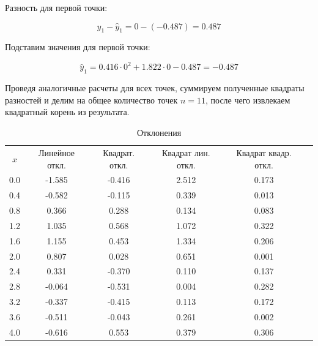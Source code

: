 \documentclass{article}
\begin{document}
            Разность для первой точки:

            \[
            y_1 - \hat{y}_1 = 0 - (-0.487) = 0.487
            \]

            Подставим значения для первой точки:

            \[
            \hat{y}_1 = 0.416 \cdot 0^2 + 1.822 \cdot 0 - 0.487 = -0.487
            \]

            Проведя аналогичные расчеты для всех точек, суммируем полученные квадраты разностей и делим на общее количество точек \(n = 11\), после чего извлекаем квадратный корень из результата.
            \begin{table}[htbp]
                  \centering
                  \label{tab:my-table}
                  \begin{tabular}{@{}cccccc@{}}
                        \(x\) & Линейное откл. & Квадрат. откл. & Квадрат лин. откл. & Квадрат квадр. откл. \\ 
                        0.0   & -1.585         & -0.416          & 2.512               & 0.173                 \\
                        0.4   & -0.582         & -0.115          & 0.339               & 0.013                 \\
                        0.8   & 0.366          & 0.288           & 0.134               & 0.083                 \\
                        1.2   & 1.035          & 0.568           & 1.072               & 0.322                 \\
                        1.6   & 1.155          & 0.453           & 1.334               & 0.206                 \\
                        2.0   & 0.807          & 0.028           & 0.651               & 0.001                 \\
                        2.4   & 0.331          & -0.370          & 0.110               & 0.137                 \\
                        2.8   & -0.064         & -0.531          & 0.004               & 0.282                 \\
                        3.2   & -0.337         & -0.415          & 0.113               & 0.172                 \\
                        3.6   & -0.511         & -0.043          & 0.261               & 0.002                 \\
                        4.0   & -0.616         & 0.553           & 0.379               & 0.306                 \\
                  \end{tabular}
                  \caption{Отклонения}
              \end{table}
\end{document}
